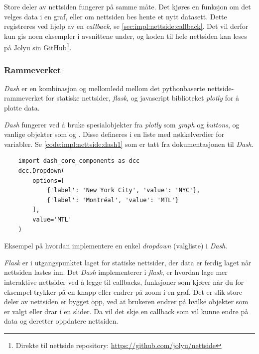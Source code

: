 Store deler av nettsiden fungerer på samme måte. 
Det kjøres en funksjon om det velges data i en graf, eller om nettsiden bes hente et nytt datasett. 
Dette registreres ved hjelp av en \textit{callback}, se \autoref{sec:impl:nettside:callback}.
Det vil derfor kun gis noen eksempler i avsnittene under, og koden til hele nettsiden kan leses på Jolyu sin GitHub\footnote{Direkte til nettside repository: \url{https://github.com/jolyu/nettside}}.

\subsubsection{Rammeverket}\label{sec:impl:nettside:rammeverk}

\textit{Dash} \cite{dash} er en kombinasjon og mellomledd mellom det pythonbaserte nettside-rammeverket for statiske nettsider, \textit{flask}, \cite{flask} og javascript biblioteket \textit{plotly} \cite{plotly} for å plotte data.

\textit{Dash} fungerer ved å bruke spesialobjekter fra \textit{plotly} som \textit{graph} og \textit{buttons}, og vanlige  objekter som  og . 
Disse defineres i en liste med nøkkelverdier for variabler. Se \autoref{code:impl:nettside:dash1} som er tatt fra dokumentasjonen til \textit{Dash}. 

\begin{listing}[!htb]
\begin{verbatim}
    import dash_core_components as dcc
    dcc.Dropdown(
        options=[
            {'label': 'New York City', 'value': 'NYC'},
            {'label': 'Montréal', 'value': 'MTL'}
        ],
        value='MTL'
    )
\end{verbatim}
\caption{Eksempel på hvordan implementere en enkel \textit{dropdown} (valgliste) i \textit{Dash}.}
\label{code:impl:nettside:dash1}
\end{listing}

\textit{Flask} er i utgangspunktet laget for statiske nettsider, der data er ferdig laget når nettsiden lastes inn. 
Det \textit{Dash} implementerer i \textit{flask}, er hvordan lage mer interaktive nettsider ved å legge til callbacks, funksjoner som kjører når du for eksempel trykker på en knapp eller endrer på zoom i en graf.
Det er slik store deler av nettsiden er bygget opp, ved at brukeren endrer på hvilke objekter som er valgt eller drar i en slider. 
Da vil det skje en callback som vil kunne endre på data og deretter oppdatere nettsiden. 



